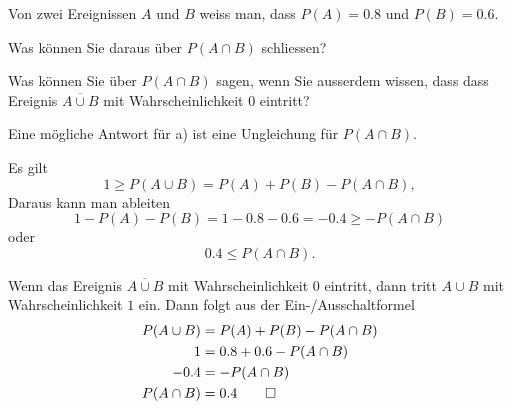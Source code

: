 Von zwei Ereignissen $A$ und $B$ weiss man, dass $P(A)=0.8$ und $P(B)=0.6$.
\begin{teilaufgaben}
\item
Was können Sie daraus über $P(A\cap B)$ schliessen?
\item
Was können Sie über $P(A\cap B)$ sagen, wenn Sie ausserdem wissen, dass 
dass Ereignis $\overline{A\cup B}$ mit Wahrscheinlichkeit $0$ eintritt?
\end{teilaufgaben}

\begin{hinweis}
Eine mögliche Antwort für a) ist eine Ungleichung für $P(A\cap B)$.
\end{hinweis}

\begin{loesung}
\begin{teilaufgaben}
\item 
Es gilt
\[
1\ge P(A\cup B)=P(A)+P(B)-P(A\cap B),
\]
Daraus kann man ableiten
\[
1-P(A)-P(B)=1-0.8-0.6=-0.4 \ge -P(A\cap B)
\]
oder
\[
0.4\le P(A\cap B).
\]
\item 
Wenn das Ereignis $\overline{A\cup B}$ mit Wahrscheinlichkeit $0$ eintritt,
dann tritt $A\cup B$ mit Wahrscheinlichkeit $1$ ein.
Dann folgt aus der Ein-/Ausschaltformel
\begin{align*}
P(A\cup B)&=P(A)+P(B)-P(A\cap B)\\
1&=0.8+0.6-P(A\cap B)\\
-0.4&=-P(A\cap B)\\
P(A\cap B)&=0.4
\qedhere
\end{align*}
\end{teilaufgaben}
\end{loesung}

